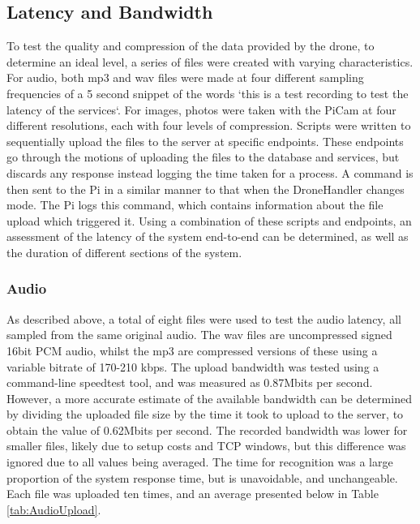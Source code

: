 \documentclass{article}
\begin{document}
\subsection{Latency and Bandwidth}\label{LatencyBandwidth}
To test the quality and compression of the data provided by the drone, to determine an ideal level, a series of files were created with varying characteristics. For audio, both mp3 and wav files were made at four different sampling frequencies of a 5 second snippet of the words `this is a test recording to test the latency of the services`. For images, photos were taken with the PiCam at four different resolutions, each with four levels of compression. Scripts were written to sequentially upload the files to the server at specific endpoints. These endpoints go through the motions of uploading the files to the database and services, but discards any response instead logging the time taken for a process. A command is then sent to the Pi in a similar manner to that when the DroneHandler changes mode. The Pi logs this command, which contains information about the file upload which triggered it. Using a combination of these scripts and endpoints, an assessment of the latency of the system end-to-end can be determined, as well as the duration of different sections of the system. 

\subsubsection{Audio}
As described above, a total of eight files were used to test the audio latency, all sampled from the same original audio. The wav files are uncompressed signed 16bit PCM audio, whilst the mp3 are compressed versions of these using a variable bitrate of 170-210 kbps. The upload bandwidth was tested using a command-line speedtest tool, and was measured as 0.87Mbits per second. However, a more accurate estimate of the available bandwidth can be determined by dividing the uploaded file size by the time it took to upload to the server, to obtain the value of 0.62Mbits per second. The recorded bandwidth was lower for smaller files, likely due to setup costs and TCP windows, but this difference was ignored due to all values being averaged. The time for recognition was a large proportion of the system response time, but is unavoidable, and unchangeable. Each file was uploaded ten times, and an average presented below in Table \ref{tab:AudioUpload}.
\end{document}
